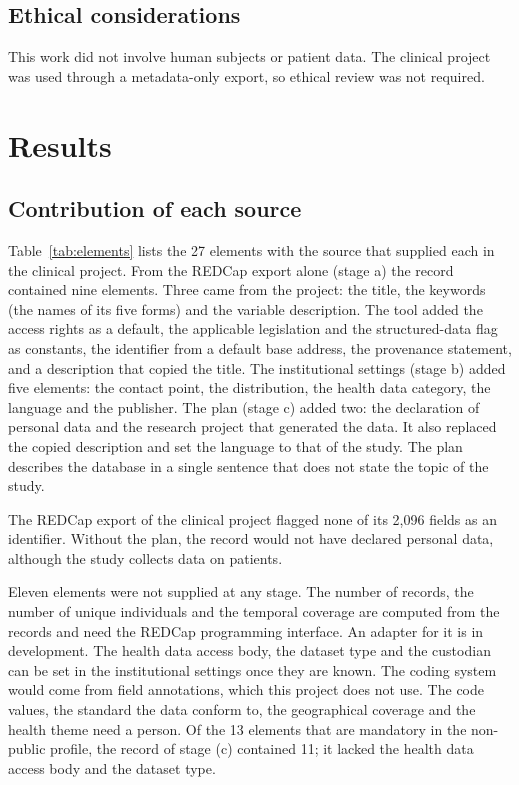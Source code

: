 \documentclass[12pt]{article}
\newif\ifrevision \revisiontrue
\begin{document}
\ifrevision\fi

\subsection{Ethical considerations}

This work did not involve human subjects or patient data. The clinical project was used
through a metadata-only export, so ethical review was not required.


\section{Results}

\subsection{Contribution of each source}

Table~\ref{tab:elements} lists the 27 elements with the source that supplied each in the
clinical project. From the REDCap export alone (stage a) the record contained nine
elements. Three came from the project: the title, the keywords (the names of its five forms)
and the variable description. The tool added the access rights as a
default, the applicable legislation and the structured-data flag as constants, the identifier from a default base address, the provenance statement, and a
description that copied the title. The institutional settings (stage b) added five
elements: the contact point, the distribution, the health data category, the language
and the publisher. The plan (stage c) added two: the declaration of personal data and
the research project that generated the data. It also replaced the copied description
and set the language to that of the study. The plan describes the database in a single
sentence that does not state the topic of the study.

\ifrevision\fi

The REDCap export of the clinical project flagged none of its 2,096 fields as an
identifier. Without the plan, the record would not have declared personal data, although
the study collects data on patients.

Eleven elements were not supplied at any stage. The number of records, the number of unique
individuals and the temporal coverage are computed from the records and need the REDCap
programming interface. An adapter for it is in development. The health data access body, the dataset type and the custodian
can be set in the institutional settings once they are known. The coding system would
come from field annotations, which this project does not use. The code values, the
standard the data conform to, the geographical coverage and the health theme need a
person. Of the 13 elements that are mandatory in the non-public profile, the record of
stage (c) contained 11; it lacked the health data access body and the dataset type.
\end{document}
